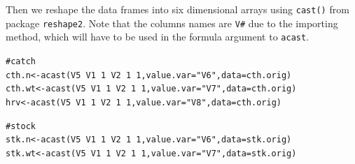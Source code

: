 \documentclass[a4paper,english,10pt]{article}\usepackage[]{graphicx}\usepackage[]{color}
\makeatletter
\newcommand{\hlnum}[1]{\textcolor[rgb]{0.2,0.2,0.2}{#1}}%
\newcommand{\hlstr}[1]{\textcolor[rgb]{0.2,0.2,0.2}{#1}}%
\newcommand{\hlcom}[1]{\textcolor[rgb]{0.2,0.267,0.4}{#1}}%
\newcommand{\hlopt}[1]{\textcolor[rgb]{0.2,0.2,0.2}{#1}}%
\newcommand{\hlstd}[1]{\textcolor[rgb]{0,0,0}{#1}}%
\newcommand{\hlkwb}[1]{\textcolor[rgb]{0.361,0.506,0.596}{#1}}%
\newcommand{\hlkwc}[1]{\textcolor[rgb]{0.361,0.506,0.596}{#1}}%
\newcommand{\hlkwd}[1]{\textcolor[rgb]{0.361,0.506,0.596}{#1}}%
\newenvironment{kframe}{%
 \def\at@end@of@kframe{}%
 \ifinner\ifhmode%
  \def\at@end@of@kframe{\end{minipage}}%
  \begin{minipage}{\columnwidth}%
 \fi\fi%
 \def\FrameCommand##1{\hskip\@totalleftmargin \hskip-\fboxsep
 \colorbox{shadecolor}{##1}\hskip-\fboxsep
     \hskip-\linewidth \hskip-\@totalleftmargin \hskip\columnwidth}%
 \MakeFramed {\advance\hsize-\width
   \@totalleftmargin\z@ \linewidth\hsize
   \@setminipage}}%
 {\par\unskip\endMakeFramed%
 \at@end@of@kframe}
\newenvironment{knitrout}{}{} %
\newcommand{\code}[1]{{\texttt{#1}}}
\newcommand{\pkg}[1]{{\texttt{#1}}}
\makeatother
\begin{document}
Then we reshape the data frames into six dimensional arrays using \code{cast()} from package \pkg{reshape2}. Note that the columns names are \code{V\#} due to the importing method, which will have to be used in the formula argument to \code{acast}.

\begin{knitrout}
\color{fgcolor}\begin{kframe}
\begin{alltt}
\hlcom{# catch}
\hlstd{cth.n} \hlkwb{<-} \hlkwd{acast}\hlstd{(V5}\hlopt{~}\hlstd{V1}\hlopt{~}\hlnum{1}\hlopt{~}\hlstd{V2}\hlopt{~}\hlnum{1}\hlopt{~}\hlnum{1}\hlstd{,} \hlkwc{value.var}\hlstd{=}\hlstr{"V6"}\hlstd{,} \hlkwc{data}\hlstd{=cth.orig)}
\hlstd{cth.wt} \hlkwb{<-} \hlkwd{acast}\hlstd{(V5}\hlopt{~}\hlstd{V1}\hlopt{~}\hlnum{1}\hlopt{~}\hlstd{V2}\hlopt{~}\hlnum{1}\hlopt{~}\hlnum{1}\hlstd{,} \hlkwc{value.var}\hlstd{=}\hlstr{"V7"}\hlstd{,} \hlkwc{data}\hlstd{=cth.orig)}
\hlstd{hrv} \hlkwb{<-} \hlkwd{acast}\hlstd{(V5}\hlopt{~}\hlstd{V1}\hlopt{~}\hlnum{1}\hlopt{~}\hlstd{V2}\hlopt{~}\hlnum{1}\hlopt{~}\hlnum{1}\hlstd{,} \hlkwc{value.var}\hlstd{=}\hlstr{"V8"}\hlstd{,} \hlkwc{data}\hlstd{=cth.orig)}

\hlcom{# stock}
\hlstd{stk.n} \hlkwb{<-} \hlkwd{acast}\hlstd{(V5}\hlopt{~}\hlstd{V1}\hlopt{~}\hlnum{1}\hlopt{~}\hlstd{V2}\hlopt{~}\hlnum{1}\hlopt{~}\hlnum{1}\hlstd{,} \hlkwc{value.var}\hlstd{=}\hlstr{"V6"}\hlstd{,} \hlkwc{data}\hlstd{=stk.orig)}
\hlstd{stk.wt} \hlkwb{<-} \hlkwd{acast}\hlstd{(V5}\hlopt{~}\hlstd{V1}\hlopt{~}\hlnum{1}\hlopt{~}\hlstd{V2}\hlopt{~}\hlnum{1}\hlopt{~}\hlnum{1}\hlstd{,} \hlkwc{value.var}\hlstd{=}\hlstr{"V7"}\hlstd{,} \hlkwc{data}\hlstd{=stk.orig)}


\end{alltt}
\end{kframe}
\end{knitrout}
\end{document}
